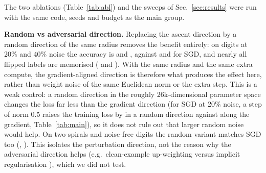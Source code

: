 The two ablations (Table~\ref{tab:abl}) and the sweeps of Sec.~\ref{sec:results} were run with the same code, seeds and budget as the main group.

\begin{table}[t]\centering\caption{Ablations at the selected $\rho$ (and $\lambda$ for SAM+WD), mean $\pm$ std over 5 seeds, same columns and units as Table~\ref{tab:main}. Compare with SAM in Table~\ref{tab:main}.}\label{tab:abl}
\resizebox{\textwidth}{!}{}\end{table}

\textbf{Random vs adversarial direction.} Replacing the ascent direction by a random direction of the same radius removes the benefit entirely: on digits at 20\% and 40\% noise the accuracy is  and , against  and  for SGD, and nearly all flipped labels are memorised ( and ). With the same radius and the same extra compute, the gradient-aligned direction is therefore what produces the effect here, rather than weight noise of the same Euclidean norm or the extra step. This is a weak control: a random direction in the roughly 26k-dimensional parameter space changes the loss far less than the gradient direction (for SGD at 20\% noise, a step of norm 0.5 raises the training loss by  in a random direction against  along the gradient, Table~\ref{tab:main}), so it does not rule out that larger random noise would help. On two-spirals and noise-free digits the random variant matches SGD too (, ). This isolates the perturbation direction, not the reason why the adversarial direction helps (e.g.\ clean-example up-weighting versus implicit regularisation \cite{baek2024why}), which we did not test.


